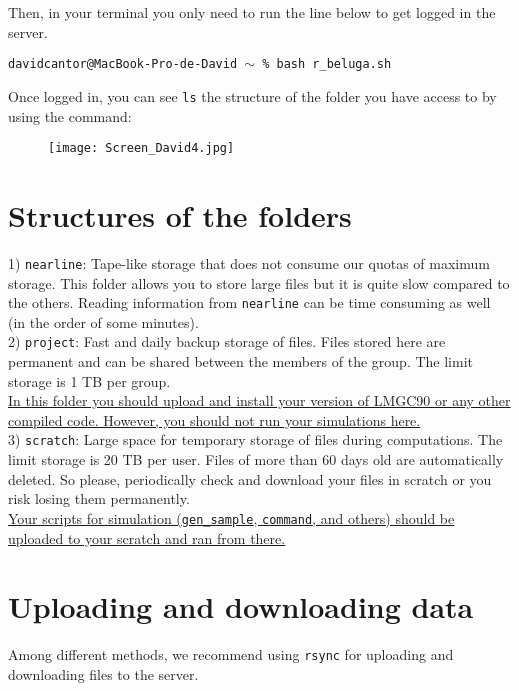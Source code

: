 \documentclass[12pt]{article}
\begin{document}
Then, in your terminal you only need to run the line below to get logged in the server.
\begin{tcolorbox}
\texttt{davidcantor@MacBook-Pro-de-David $\sim$ \% bash r\_beluga.sh}
\end{tcolorbox}

Once logged in, you can see \texttt{ls} the structure of the folder you have access to by using the command:
\begin{figure}[H]
  \texttt{[image: Screen\_David4.jpg]}
\end{figure}


\section*{Structures of the folders}
    
    1) \texttt{nearline}: Tape-like storage that does not consume our quotas of maximum storage. This folder allows you to store large files but it is quite slow compared to the others. Reading information from \texttt{nearline} can be time consuming as well (in the order of some minutes). \\
    
    2) \texttt{project}: Fast and daily backup storage of files. Files stored here are permanent and can be shared between the members of the group. The limit storage is 1 TB per group. \\ \break
    \uline{In this folder you should upload and install your version of LMGC90 or any other compiled code. However, you should not run your simulations here.} \\

    3) \texttt{scratch}: Large space for temporary storage of files during computations. The limit storage is 20 TB per user.
    Files of more than 60 days old are automatically deleted. So please, periodically check and download your files in scratch or you risk losing them permanently. \\ \break
    \uline{Your scripts for simulation (\texttt{gen\_sample}, \texttt{command}, and others) should be uploaded to your scratch and ran from there.}


\section*{Uploading and downloading data}
Among different methods, we recommend using \texttt{rsync} for uploading and downloading files to the server.
\end{document}
